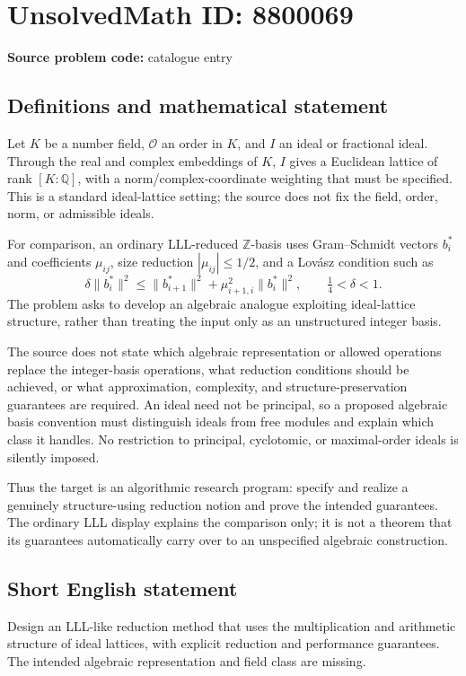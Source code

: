 \documentclass[11pt]{article}
\newcommand{\Z}{\mathbb{Z}}
\newcommand{\Q}{\mathbb{Q}}
\begin{document}
\section*{UnsolvedMath ID: 8800069}
\textbf{Source problem code:} catalogue entry
\subsection{Definitions and mathematical statement}
Let $K$ be a number field, $\mathcal O$ an order in $K$, and $I$ an ideal or fractional ideal. Through the real and complex embeddings of $K$, $I$ gives a Euclidean lattice of rank $[K:\Q]$, with a norm/complex-coordinate weighting that must be specified. This is a standard ideal-lattice setting; the source does not fix the field, order, norm, or admissible ideals.

For comparison, an ordinary LLL-reduced $\Z$-basis uses Gram--Schmidt vectors $b_i^*$ and coefficients $\mu_{ij}$, size reduction $|\mu_{ij}|\le1/2$, and a Lovász condition such as
\[
 \delta\|b_i^*\|^2\le
 \|b_{i+1}^*\|^2+\mu_{i+1,i}^2\|b_i^*\|^2,
 \qquad\tfrac14<\delta<1.
\]
The problem asks to develop an algebraic analogue exploiting ideal-lattice structure, rather than treating the input only as an unstructured integer basis.

The source does not state which algebraic representation or allowed operations replace the integer-basis operations, what reduction conditions should be achieved, or what approximation, complexity, and structure-preservation guarantees are required. An ideal need not be principal, so a proposed algebraic basis convention must distinguish ideals from free modules and explain which class it handles. No restriction to principal, cyclotomic, or maximal-order ideals is silently imposed.

Thus the target is an algorithmic research program: specify and realize a genuinely structure-using reduction notion and prove the intended guarantees. The ordinary LLL display explains the comparison only; it is not a theorem that its guarantees automatically carry over to an unspecified algebraic construction.
\subsection{Short English statement}
Design an LLL-like reduction method that uses the multiplication and arithmetic structure of ideal lattices, with explicit reduction and performance guarantees. The intended algebraic representation and field class are missing.
\end{document}
